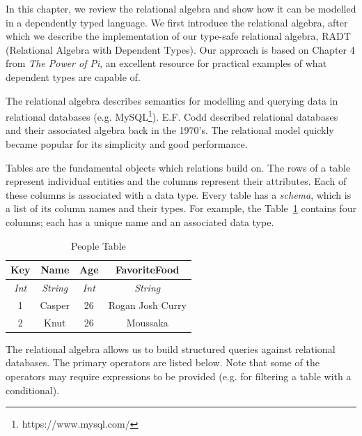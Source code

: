 \documentclass[12pt]{report}
\begin{document}
In this chapter, we review the relational algebra and show how it can be modelled in a dependently typed language.
We first introduce the relational algebra, after which we describe the implementation of our type-safe relational algebra, RADT (Relational Algebra with Dependent Types).
Our approach is based on Chapter 4 from \textit{The Power of Pi}\cite{OurySwierstra08PowerOfPi}, an excellent resource for practical examples of what dependent types are capable of.

The relational algebra describes semantics for modelling and querying data in relational databases (e.g. MySQL\footnote{https://www.mysql.com/}).
E.F. Codd described relational databases and their associated algebra back in the 1970's\cite{codd70}.
The relational model quickly became popular for its simplicity and good performance.

Tables are the fundamental objects which relations build on.
The rows of a table represent individual entities and the columns represent their attributes.
Each of these columns is associated with a data type.
Every table has a \textit{schema}, which is a list of its column names and their types.
For example, the Table~\ref{tab:people_table} contains four columns; each has a unique name and an associated data type.

\begin{table}[tb]
    \caption{People Table}
    \label{tab:people_table}
    \centering

    \begin{tabular}{|c|c|c|c|}
    \hline

    \hline
    \textbf{Key} & \textbf{Name} & \textbf{Age} & \textbf{FavoriteFood} \\
    \hline
    \textit{Int} & \textit{String} & \textit{Int} & \textit{String} \\
    \hline
    \hline
       1 & Casper & 26 & Rogan Josh Curry \\
       2 & Knut & 26 & Moussaka \\
    \hline

    \end{tabular}
\end{table}

The relational algebra allows us to build structured queries against relational databases.
The primary operators are listed below.
Note that some of the operators may require expressions to be provided (e.g. for filtering a table with a conditional).
\end{document}
